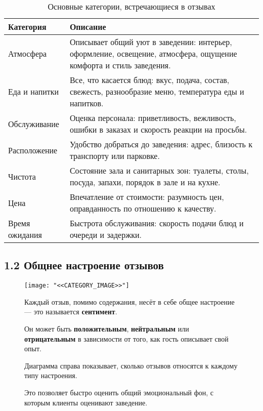 \documentclass[a4paper,12pt]{extarticle}
\begin{document}
\begin{table}[H]
\centering
\caption*{Основные категории, встречающиеся в отзывах}
\renewcommand{\arraystretch}{1.4}
\begin{tabular}{p{3.5cm}p{12cm}}
\toprule
\textbf{Категория} & \textbf{Описание} \\
\midrule
Атмосфера & Описывает общий уют в заведении: интерьер, оформление, освещение, атмосфера, ощущение комфорта и стиль заведения. \\
Еда и напитки & Все, что касается блюд: вкус, подача, состав, свежесть, разнообразие меню, температура еды и напитков. \\
Обслуживание & Оценка персонала: приветливость, вежливость, ошибки в заказах и скорость реакции на просьбы. \\
Расположение & Удобство добраться до заведения: адрес, близость к транспорту или парковке. \\
Чистота & Состояние зала и санитарных зон: туалеты, столы, посуда, запахи, порядок в зале и на кухне. \\
Цена & Впечатление от стоимости: разумность цен, оправданность по отношению к качеству. \\
Время ожидания & Быстрота обслуживания: скорость подачи блюд и очереди и задержки. \\
\bottomrule
\end{tabular}
\end{table}



\subsection*{1.2 Общнее настроение отзывов}

\begin{figure}[H]
    \centering
    \begin{minipage}{0.48\textwidth}
        \texttt{[image: "<<CATEGORY\_IMAGE>>"]}
    \end{minipage}%
    \hfill
    \begin{minipage}{0.48\textwidth}
        \small
        Каждый отзыв, помимо содержания, несёт в себе общее настроение — это называется \textbf{сентимент}.
        \vspace{0.5em}

        Он может быть \textbf{положительным}, \textbf{нейтральным} или \textbf{отрицательным} в зависимости от того, как гость описывает свой опыт.

        \vspace{0.5em}
        Диаграмма справа показывает, сколько отзывов относятся к каждому типу настроения.

        \vspace{0.5em}
        Это позволяет быстро оценить общий эмоциональный фон, с которым клиенты оценивают заведение.
    \end{minipage}
\end{figure}
\end{document}
